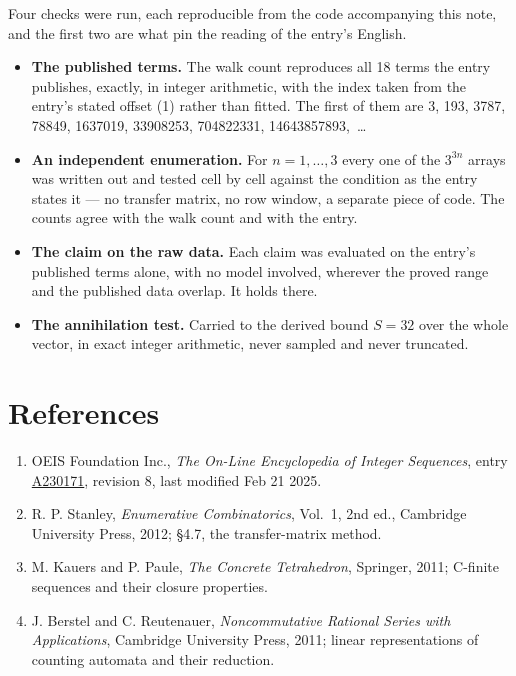 \documentclass[11pt]{article}
\theoremstyle{definition}
\begin{document}
Four checks were run, each reproducible from the code accompanying this note, and the first two are what pin the reading of the entry's English.

\begin{itemize}

\item {\bfseries The published terms.} The walk count reproduces all 18 terms the entry publishes, exactly, in integer arithmetic, with the index taken from the entry's stated offset (1) rather than fitted. The first of them are 3, 193, 3787, 78849, 1637019, 33908253, 704822331, 14643857893,~\dots

\item {\bfseries An independent enumeration.} For $n = 1,\dots,3$ every one of the $3^{3n}$ arrays was written out and tested cell by cell against the condition as the entry states it --- no transfer matrix, no row window, a separate piece of code. The counts agree with the walk count and with the entry.

\item {\bfseries The claim on the raw data.} Each claim was evaluated on the entry's published terms alone, with no model involved, wherever the proved range and the published data overlap. It holds there.

\item {\bfseries The annihilation test.} Carried to the derived bound $S = 32$ over the whole vector, in exact integer arithmetic, never sampled and never truncated.

\end{itemize}

\section{References}

\begin{enumerate}

\item OEIS Foundation Inc., \emph{The On-Line Encyclopedia of Integer Sequences}, entry \href{https://oeis.org/A230171}{A230171}, revision 8, last modified Feb 21 2025.

\item R. P. Stanley, \emph{Enumerative Combinatorics}, Vol.~1, 2nd ed., Cambridge University Press, 2012; \S4.7, the transfer-matrix method.

\item M. Kauers and P. Paule, \emph{The Concrete Tetrahedron}, Springer, 2011; C-finite sequences and their closure properties.

\item J. Berstel and C. Reutenauer, \emph{Noncommutative Rational Series with Applications}, Cambridge University Press, 2011; linear representations of counting automata and their reduction.

\end{enumerate}
\end{document}
